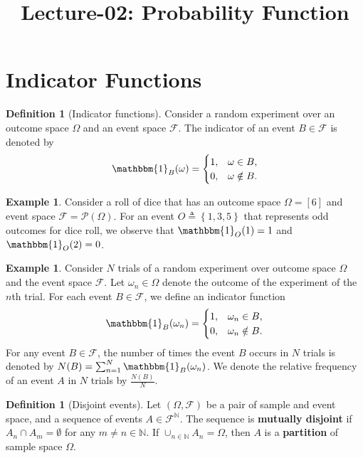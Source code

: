 \documentclass[letterpaper,10pt,english]{article}
\date{}
\title{Lecture-02: Probability Function}
\author{}
\theoremstyle{plain}
\theoremstyle{definition}
\newtheorem{defn}[thm]{Definition}
\newtheorem{exmp}[thm]{Example}
\theoremstyle{remark}
\newcommand{\EQ}[1]{\begin{equation*}#1\end{equation*}}
\newcommand{\set}[1]{\left\{#1\right\}}
\newcommand{\Ind}[1]{\mathbbm{1}_{#1}}
\newcommand{\N}{\mathbb{N}}
\newcommand{\cP}{\mathcal{P}}
\newcommand{\sF}{\mathscr{F}}
\begin{document}
\maketitle

\section{Indicator Functions}
\begin{defn}[Indicator functions]
Consider a random experiment over an outcome space $\Omega$ and an event space $\sF$. 
The indicator of an event $B \in \sF$ is denoted by 
\EQ{
\Ind{B}(\omega) = 
\begin{cases}
1, & \omega \in B,\\
0, & \omega \notin B.
\end{cases}
}
\end{defn}
\begin{shaded}
\begin{exmp} 
Consider a roll of dice that has an outcome space $\Omega = [6]$ and event space $\sF = \cP(\Omega)$. 
For an event $O \triangleq \set{1,3,5}$ that represents odd outcomes for dice roll, we observe that $\Ind{O}(1) = 1$ and $\Ind{O}(2) = 0$. 
\end{exmp}
\begin{exmp}
Consider $N$ trials of a random experiment over outcome space $\Omega$ and the event space $\sF$.  
Let $\omega_n \in \Omega$ denote the outcome of the experiment of the $n$th trial. 
For each event $B \in \sF$, we define an indicator function  
\EQ{
\Ind{B}(\omega_n) = 
\begin{cases}
1, & \omega_n \in B,\\
0, & \omega_n \notin B.
\end{cases}
}
For any event $B \in \sF$, 
the number of times the event $B$ occurs in $N$ trials is denoted by $N(B) = \sum_{n=1}^N\Ind{B}(\omega_n)$. 
We denote the relative frequency of an event $A$ in $N$ trials by $\frac{N(B)}{N}$. 
\end{exmp}
\end{shaded}
\begin{defn}[Disjoint events]
Let $(\Omega,\sF)$ be a pair of sample and event space, 
and a sequence of events $A \in \sF^\N$. 
The sequence is \textbf{mutually disjoint} if $A_n\cap A_m = \emptyset$ for any $m\neq n \in \N$. 
If $\cup_{n \in \N}A_n = \Omega$, then $A$ is a \textbf{partition} of sample space $\Omega$.   
\end{defn}
\end{document}
